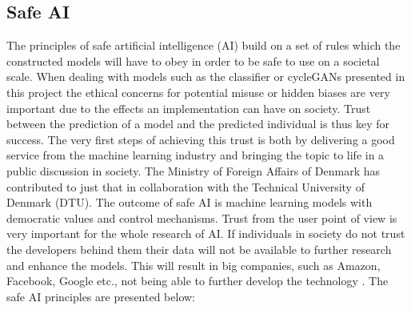 \documentclass[12pt, fleqn, titlepage]{article}
\begin{document}

\subsection{Safe AI}

The principles of safe artificial intelligence (AI) build on a set of rules which the constructed models will have to obey in order to be safe to use on a societal scale. When dealing with models such as the classifier or cycleGANs presented in this project the ethical concerns for potential misuse or hidden biases are very important due to the effects an implementation can have on society. Trust between the prediction of a model and the predicted individual is thus key for success. The very first steps of achieving this trust is both by delivering a good service from the machine learning industry and bringing the topic to life in a public discussion in society. The Ministry of Foreign Affairs of Denmark has contributed to just that in collaboration with the Technical University of Denmark (DTU). The outcome of safe AI is machine learning models with democratic values and control mechanisms. Trust from the user point of view is very important for the whole research of AI. If individuals in society do not trust the developers behind them their data will not be available to further research and enhance the models. This will result in big companies, such as Amazon, Facebook, Google etc., not being able to further develop the technology \cite{larsk}. The safe AI principles are presented below:
\end{document}
